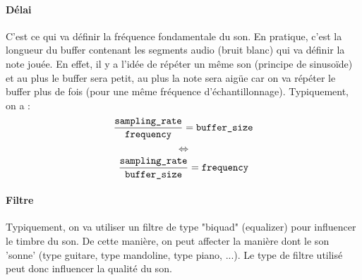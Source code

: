 \documentclass[letterpaper, 12pt]{article}
\begin{document}
			\paragraph{Délai} C'est ce qui va définir la fréquence fondamentale du son. En pratique, c'est la longueur du buffer contenant
				les segments audio (bruit blanc) qui va définir la note jouée. En effet, il y a l'idée de répéter un même son (principe de
				sinusoïde) et au plus le buffer sera petit, au plus la note sera aigüe car on va répéter le buffer plus de fois (pour une
				même fréquence d'échantillonnage). Typiquement, on a : 
				$$ \frac{\text{\texttt{sampling\_rate}}}{\text{\texttt{frequency}}} = \text{\texttt{buffer\_size}} $$
				$$ \Leftrightarrow$$  
				$$\frac{\text{\texttt{sampling\_rate}}}{\text{\texttt{buffer\_size}}} = \text{\texttt{frequency}} $$
			\paragraph{Filtre} Typiquement, on va utiliser un filtre de type "biquad" (equalizer) pour influencer le timbre du son. 
				De cette manière, on peut affecter la manière dont le son 'sonne' (type guitare, type mandoline, type piano, ...).
				Le type de filtre utilisé peut donc influencer la qualité du son.
%
\end{document}
